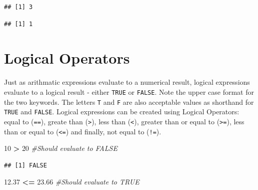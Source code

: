 \documentclass[]{krantz}
\makeatletter
\newenvironment{Shaded}{\begin{snugshade}}{\end{snugshade}}
\newcommand{\DecValTok}[1]{\textcolor[rgb]{0.06,0.06,0.06}{#1}}
\newcommand{\FloatTok}[1]{\textcolor[rgb]{0.06,0.06,0.06}{#1}}
\newcommand{\StringTok}[1]{\textcolor[rgb]{0.5,0.5,0.5}{#1}}
\newcommand{\CommentTok}[1]{\textcolor[rgb]{0.56,0.35,0.01}{\textit{#1}}}
\newcommand{\OperatorTok}[1]{\textcolor[rgb]{0.81,0.36,0.00}{\textbf{#1}}}
\newenvironment{kframe}{%
\medskip{}
\setlength{\fboxsep}{.8em}
 \def\at@end@of@kframe{}%
 \ifinner\ifhmode%
  \def\at@end@of@kframe{\end{minipage}}%
  \begin{minipage}{\columnwidth}%
 \fi\fi%
 \def\FrameCommand##1{\hskip\@totalleftmargin \hskip-\fboxsep
 \colorbox{shadecolor}{##1}\hskip-\fboxsep
     \hskip-\linewidth \hskip-\@totalleftmargin \hskip\columnwidth}%
 \MakeFramed {\advance\hsize-\width
   \@totalleftmargin\z@ \linewidth\hsize
   \@setminipage}}%
 {\par\unskip\endMakeFramed%
 \at@end@of@kframe}
\renewenvironment{Shaded}{\begin{kframe}}{\end{kframe}}
\theoremstyle{definition}
\theoremstyle{definition}
\theoremstyle{definition}
\theoremstyle{remark}
\makeatother
\begin{document}
\begin{Shaded}
\end{Shaded}

\begin{verbatim}
## [1] 3
\end{verbatim}

\begin{Shaded}
\end{Shaded}

\begin{verbatim}
## [1] 1
\end{verbatim}

\section{Logical Operators}\label{logical-operators}

Just as arithmatic expressions evaluate to a numerical result, logical
expressions evaluate to a logical result - either \texttt{TRUE} or
\texttt{FALSE}. Note the upper case format for the two keywords. The
letters \texttt{T} and \texttt{F} are also acceptable values as
shorthand for \texttt{TRUE} and \texttt{FALSE}. Logical expressions can
be created using Logical Operators: equal to (\texttt{==}), greate than
(\texttt{\textgreater{}}), less than (\texttt{\textless{}}), greater
than or equal to (\texttt{\textgreater{}=}), less than or equal to
(\texttt{\textless{}=}) and finally, not equal to (\texttt{!=}).

\begin{Shaded}
\begin{Highlighting}[]
\DecValTok{10} \OperatorTok{>}\StringTok{ }\DecValTok{20} \CommentTok{#Should evaluate to FALSE}
\end{Highlighting}
\end{Shaded}

\begin{verbatim}
## [1] FALSE
\end{verbatim}

\begin{Shaded}
\begin{Highlighting}[]
\FloatTok{12.37} \OperatorTok{<=}\StringTok{ }\FloatTok{23.66} \CommentTok{#Should evaluate to TRUE}
\end{Highlighting}
\end{Shaded}
\end{document}
